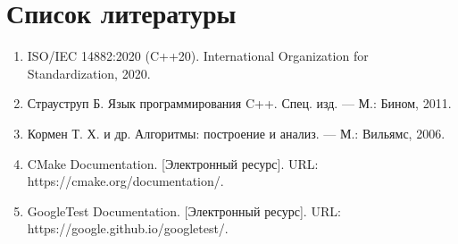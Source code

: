\section{Список литературы}

\begin{enumerate}
  \item ISO/IEC 14882:2020 (C++20). International Organization for Standardization, 2020.
  \item Страуструп Б. Язык программирования C++. Спец. изд. — М.: Бином, 2011.
  \item Кормен Т. Х. и др. Алгоритмы: построение и анализ. — М.: Вильямс, 2006.
  \item CMake Documentation. [Электронный ресурс]. URL: https://cmake.org/documentation/.
  \item GoogleTest Documentation. [Электронный ресурс]. URL: https://google.github.io/googletest/.
\end{enumerate}

